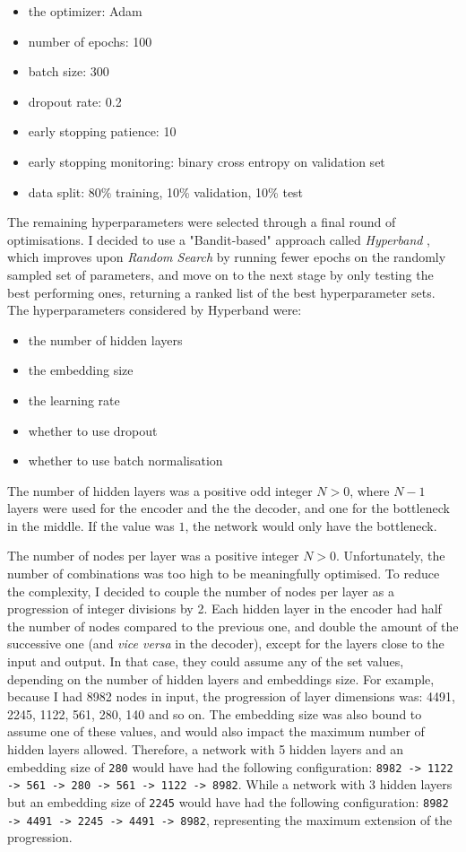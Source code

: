 \begin{itemize}
  \item the optimizer: Adam
  \item number of epochs: 100
  \item batch size: 300
  \item dropout rate: 0.2
  \item early stopping patience: 10
  \item early stopping monitoring: binary cross entropy on validation set
  \item data split: 80\% training, 10\% validation, 10\% test
\end{itemize}

The remaining hyperparameters were selected through a final round of optimisations. I decided to use a "Bandit-based" approach
called \textit{Hyperband} \cite{DBLP:journals/corr/LiJDRT16}, which improves upon \textit{Random Search}
by running fewer epochs on the randomly sampled set of parameters,
and move on to the next stage by only testing the best performing ones, returning a ranked list of the best hyperparameter sets.
The hyperparameters considered by Hyperband were:

\begin{itemize}
  \item the number of hidden layers
  \item the embedding size
  \item the learning rate
  \item whether to use dropout
  \item whether to use batch normalisation
\end{itemize}

The number of hidden layers was a positive odd integer $N > 0$, where $N-1$ layers were used for the encoder and the
the decoder, and one for the bottleneck in the middle.
If the value was $1$, the network would only have the bottleneck.

The number of nodes per layer was a positive integer $N > 0$. Unfortunately, the number of combinations was too high to be
meaningfully optimised. To reduce the complexity, I decided to couple the number of nodes per layer as a progression
of integer divisions by 2.
Each hidden layer in the encoder had half the number of nodes compared to the previous one, and double the amount of the successive one
(and \textit{vice versa} in the decoder), except for the layers close to the input and output. In that case, they could assume any
of the set values, depending on the number of hidden layers and embeddings size. For example, because I had 8982 nodes in input, the progression of layer dimensions
was: 4491, 2245, 1122, 561, 280, 140 and so on. The embedding size was also bound to assume one of these values, and would also impact
the maximum number of hidden layers allowed.
Therefore, a network with 5 hidden layers and an embedding size of \verb|280|
would have had the following configuration: \verb|8982 -> 1122 -> 561 -> 280 -> 561 -> 1122 -> 8982|. While a network with
3 hidden layers but an embedding size of \verb|2245| would have had the following configuration:
\verb|8982 -> 4491 -> 2245 -> 4491 -> 8982|, representing the maximum extension of the progression.

